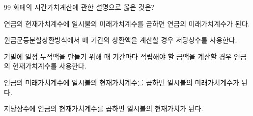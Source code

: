 \begin{question}{99}
화폐의 시간가치계산에 관한 설명으로 옳은 것은?
\begin{choices}
  \item 연금의 현재가치계수에 일시불의 미래가치계수를 곱하면 연금의 미래가치계수가 된다.
  \item 원금균등분할상환방식에서 매 기간의 상환액을 계산할 경우 저당상수를 사용한다.
  \item 기말에 일정 누적액을 만들기 위해 매 기간마다 적립해야 할 금액을 계산할 경우 연금의 현재가치계수를 사용한다.
  \item 연금의 미래가치계수에 일시불의 현재가치계수를 곱하면 일시불의 미래가치계수가 된다.
  \item 저당상수에 연금의 현재가치계수를 곱하면 일시불의 현재가치가 된다.
\end{choices}
\end{question}
